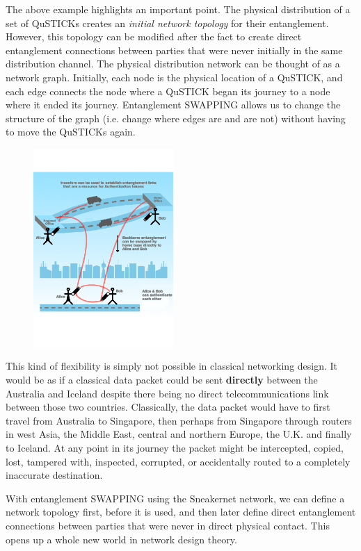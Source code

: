 \documentclass[twocolumn, aps, rmp, amsmath, amssymb, nofootinbib, superscriptaddress, longbibliography, floatfix, table-of-contents, eqsecnum]{revtex4-2}
\begin{document}
The above example highlights an important point. The physical distribution of a set of QuSTICKs creates an \textit{initial network topology} for their entanglement. However, this topology can be modified after the fact to create direct entanglement connections between parties that were never initially in the same distribution channel. The physical distribution network can be thought of as a network graph. Initially, each node is the physical location of a QuSTICK, and each edge connects the node where a QuSTICK began its journey to a node where it ended its journey. Entanglement SWAPPING allows us to change the structure of the graph (i.e. change where edges are and are not) without having to move the QuSTICKs again. 
 
\begin{figure}[htbp!]
	\includegraphics[clip=true, width=0.475\textwidth]{SWAPPING}
	\caption{} \label{fig:SWAPPING}
\end{figure}

This kind of flexibility is simply not possible in classical networking design. It would be as if a classical data packet could be sent \textbf{directly} between the Australia and Iceland despite there being no direct telecommunications link between those two countries. Classically, the data packet would have to first travel from Australia to Singapore, then perhaps from Singapore through routers in west Asia, the Middle East, central and northern Europe, the U.K. and finally to Iceland. At any point in its journey the packet might be intercepted, copied, lost, tampered with, inspected, corrupted, or accidentally routed to a completely inaccurate destination. 

With entanglement SWAPPING using the Sneakernet network, we can define a network topology first, before it is used, and then later define direct entanglement connections between parties that were never in direct physical contact. This opens up a whole new world in network design theory. 
\end{document}
